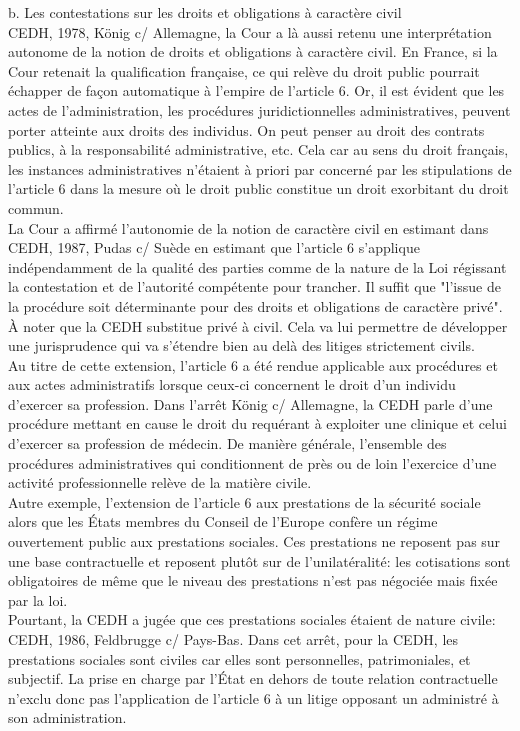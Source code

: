 \documentclass[10pt, a4paper, openany]{book}
\begin{document}
b. Les contestations sur les droits et obligations à caractère civil \\
CEDH, 1978, König c/ Allemagne, la Cour a là aussi retenu une interprétation autonome de la notion de droits et obligations à caractère civil. En France, si la Cour retenait la qualification française, ce qui relève du droit public pourrait échapper de façon automatique à l'empire de l'article 6. Or, il est évident que les actes de l'administration, les procédures juridictionnelles administratives, peuvent porter atteinte aux droits des individus. On peut penser au droit des contrats publics, à la responsabilité administrative, etc. Cela car au sens du droit français, les instances administratives n'étaient à priori par concerné par les stipulations de l'article 6 dans la mesure où le droit public constitue un droit exorbitant du droit commun. \\
La Cour a affirmé l'autonomie de la notion de caractère civil en estimant dans CEDH, 1987, Pudas c/ Suède en estimant que l'article 6 s'applique indépendamment de la qualité des parties comme de la nature de la Loi régissant la contestation et de l'autorité compétente pour trancher. Il suffit que "l'issue de la procédure soit déterminante pour des droits et obligations de caractère privé".  À noter que la CEDH substitue privé à civil. Cela va lui permettre de développer une jurisprudence qui va s'étendre bien au delà des litiges strictement civils. \\
Au titre de cette extension, l'article 6 a été rendue applicable aux procédures et aux actes administratifs lorsque ceux-ci concernent le droit d'un individu d'exercer sa profession. Dans l'arrêt König c/ Allemagne, la CEDH parle d'une procédure mettant en cause le droit du requérant à exploiter une clinique et celui d'exercer sa profession de médecin. De manière générale, l'ensemble des procédures administratives qui conditionnent de près ou de loin l'exercice d'une activité professionnelle relève de la matière civile. \\


Autre exemple, l'extension de l'article 6 aux prestations de la sécurité sociale alors que les États membres du Conseil de l'Europe confère un régime ouvertement public aux prestations sociales. Ces prestations ne reposent pas sur une base contractuelle et reposent plutôt sur de l'unilatéralité: les cotisations sont obligatoires de même que le niveau des prestations n'est pas négociée mais fixée par la loi. \\
Pourtant, la CEDH a jugée que ces prestations sociales étaient de nature civile: CEDH, 1986, Feldbrugge c/ Pays-Bas. Dans cet arrêt, pour la CEDH, les prestations sociales sont civiles car elles sont personnelles, patrimoniales, et subjectif. La prise en charge par l'État en dehors de toute relation contractuelle n'exclu donc pas l'application de l'article 6 à un litige opposant un administré à son administration. 
\end{document}
